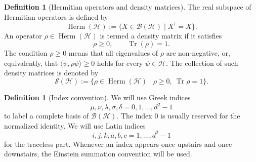 \documentclass[notitlepage,aip,reprint,onecolumn]{revtex4-1}
\theoremstyle{definition}
\newtheorem{definition}[theorem]{Definition}
\begin{document}
\begin{definition}[Hermitian operators and density matrices]
The real subspace of Hermitian operators is defined by
\[
     \operatorname{Herm}(\mathcal H):=\{X\in\mathcal B(\mathcal H)\mid X^\dagger=X\}.
\]
An operator \(\rho\in\operatorname{Herm}(\mathcal H)\) is termed a density matrix if it satisfies
\[
     \rho\geq 0,
     \qquad
     \operatorname{Tr}(\rho)=1.
\]
The condition \(\rho \geq 0\) means that all eigenvalues of \(\rho\) are non-negative, or, equivalently, that \(\langle \psi, \rho \psi \rangle \geq 0\) holds for every \(\psi \in \mathcal H\). The collection of such density matrices is denoted by
\[
     \mathcal S(\mathcal H):=\{\rho\in\operatorname{Herm}(\mathcal H)\mid \rho\geq 0,\ \operatorname{Tr}\rho=1\}.
\]
\end{definition}
\begin{definition}[Index convention]
We will use Greek indices
\[
     \mu,\nu,\lambda,\sigma,\delta=0,1,\ldots,d^2-1
\]
to label a complete basis of \(\mathcal B(\mathcal H)\). The index \(0\) is usually reserved for the normalized identity. We will use Latin indices
\[
     i,j,k,a,b,c=1,\ldots,d^2-1
\]
for the traceless part. Whenever an index appears once upstairs and once downstairs, the Einstein summation convention will be used.
\end{definition}
\end{document}
